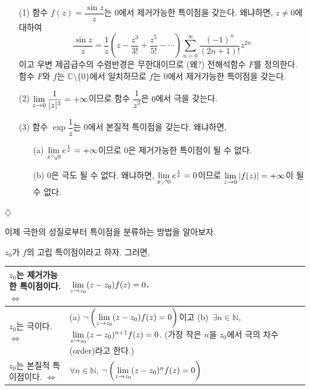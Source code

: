 \begin{salt_example}\label{example-4-14}
\
\begin{itemize}
\item[(1)] 함수 $f(z)=\dfrac{\sin z}z$는 $0$에서 제거가능한 특이점을 갖는다.
왜냐하면, $z\ne0$에 대하여
\[
\dfrac{\sin z}z = \dfrac 1z\left( z - \dfrac{z^3}{3!} + \dfrac{z^5}{5!} - \cdots
\right) \sum_{n=0}^\infty \dfrac{(-1)^n}{(2n+1)!}z^{2n}
\]
이고 우변 제곱급수의 수렴반경은 무한대이므로 (왜?)
전해석함수 $F$를 정의한다. 함수 $F$와 $f$는 $\mathbb C\setminus \{0\}$에서
일치하므로 $f$는 $0$에서 제거가능한 특이점을 갖는다.
\item[(2)] $\lim\limits_{z\to 0} \displaystyle\frac1{|z|^3} = + \infty$이므로
함수 $\dfrac1{z^3}$은 $0$에서 극을 갖는다.
\item[(3)] 함수 $\exp \dfrac1z$는 $0$에서 본질적 특이점을 갖는다. 왜냐하면,
\begin{itemize}
\item[(a)] $\lim\limits_{x\searrow 0} e^{\frac1x} = + \infty$이므로
$0$은 제거가능한 특이점이 될 수 없다.
\item[(b)] $0$은 극도 될 수 없다. 왜냐하면,
$\lim\limits_{x\nearrow 0} e^{\frac1x} =0$이므로  
$\lim\limits_{z\to 0} |f(z)| = + \infty$이 될 수 없다.
\end{itemize}
\end{itemize}
\hfill $\diamondsuit$
\end{salt_example}

이제 극한의 성질로부터 특이점을 분류하는 방법을 알아보자.

\begin{salt_theorem}[극한을 이용한 특이점의 분류] \label{thm-4-8}
$z_0$가 $f$의 고립 특이점이라고 하자. 그러면,
\begin{center}
\begin{tabular}{ |p{6cm}|p{6.5cm}| } 
 \hline
$z_0$는 제거가능한 특이점이다. \hfill $\Leftrightarrow$ 
& $\lim\limits_{z\to z_0} (z-z_0)f(z)=0$. \\ \hline 
$z_0$는 극이다. \hfill $\Leftrightarrow$ 
& (a) $\neg \left( \lim\limits_{z\to z_0} (z-z_0)f(z) = 0 \right)$이고 
(b)~$\exists n\in \mathbb N$, 
$\lim\limits_{z\to z_0} (z-z_0)^{n+1}f(z) = 0$.
(가장 작은 $n$을 $z_0$에서 극의 차수(order)라고 한다.) \\ \hline
$z_0$는 본질적 특이점이다. \hfill $\Leftrightarrow$ 
& $\forall n\in \mathbb N$,  
$\neg\left( \lim\limits_{z\to z_0} (z-z_0)^nf(z) = 0 \right)$ \\ 
 \hline
\end{tabular}
\end{center}
\end{salt_theorem}

